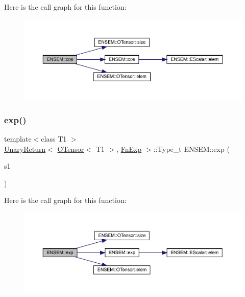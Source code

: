 Here is the call graph for this function\+:\nopagebreak
\begin{figure}[H]
\begin{center}
\leavevmode
\includegraphics[width=350pt]{de/d87/group__obstensor_gab6c0f7f88211609a81b1ab43c346d285_cgraph}
\end{center}
\end{figure}
\mbox{\label{group__obstensor_ga6403c57fdf642c4972f11c2251aff2ef}} 
\subsubsection{\texorpdfstring{exp()}{exp()}}
{\footnotesize\ttfamily template$<$class T1 $>$ \\
\mbox{\hyperlink{structENSEM_1_1UnaryReturn}{Unary\+Return}}$<$ \mbox{\hyperlink{classENSEM_1_1OTensor}{O\+Tensor}}$<$ T1 $>$, \mbox{\hyperlink{structENSEM_1_1FnExp}{Fn\+Exp}} $>$\+::Type\+\_\+t E\+N\+S\+E\+M\+::exp (\begin{DoxyParamCaption}\item[{const \mbox{\hyperlink{classENSEM_1_1OTensor}{O\+Tensor}}$<$ T1 $>$ \&}]{s1 }\end{DoxyParamCaption})\hspace{0.3cm}{\ttfamily [inline]}}

Here is the call graph for this function\+:\nopagebreak
\begin{figure}[H]
\begin{center}
\leavevmode
\includegraphics[width=350pt]{de/d87/group__obstensor_ga6403c57fdf642c4972f11c2251aff2ef_cgraph}
\end{center}
\end{figure}
\mbox{\label{group__obstensor_ga246cc858f35ed63a911bfa33abd22d98}} 
